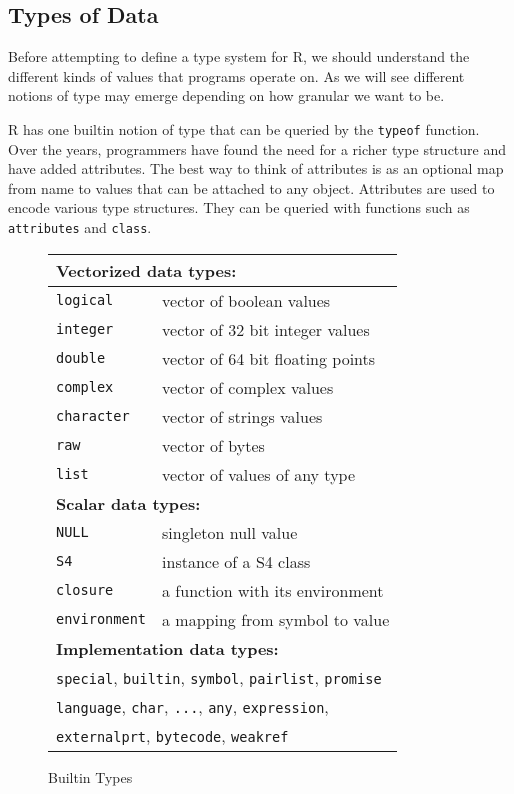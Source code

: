\documentclass[acmsmall,10pt,review,anonymous]{acmart}\settopmatter{printfolios=true,printccs=false,printacmref=false}
\begin{document}
\subsection{Types of Data}

Before attempting to define a type system for R, we should understand the
different kinds of values that programs operate on.  As we will see
different notions of type may emerge depending on how granular we want to
be.

\renewcommand{\k}[1]{{\tt #1}\xspace}

R has one builtin notion of type that can be queried by the \k{typeof}
function. Over the years, programmers have found the need for a richer type
structure and have added attributes. The best way to think of attributes is
as an optional map from name to values that can be attached to any object.
Attributes are used to encode various type structures. They can be queried
with functions such as \k{attributes} and \k{class}.

\begin{wrapfigure}{r}{6.1cm}
\footnotesize\begin{tabular}{l|l@{}}\hline
\multicolumn{2}{l}{\bf Vectorized data types:}  \\\hline
\k{logical}  & vector of boolean values\\
\k{integer}   & vector of 32 bit integer values\\
\k{double} & vector of 64 bit floating points\\
\k{complex} & vector of complex values\\
\k{character} & vector of strings values\\
\k{raw} & vector of bytes\\
\k{list} & vector of values of any type\\\hline
\multicolumn{2}{l}{\bf Scalar data types:}\\\hline
\k{NULL}  &  singleton null value\\
\k{S4}    &  instance of a S4 class \\
\k{closure} & a function with its environment\\
\k{environment} & a mapping from symbol to value \\\hline
\multicolumn{2}{l}{\bf Implementation data types:}\\\hline
\multicolumn{2}{l}{\k{special},
\k{builtin},
\k{symbol},
\k{pairlist},
\k{promise}}\\
\multicolumn{2}{l}{
\k{language},
\k{char},
\k{...}, 
\k{any},
\k{expression},
}\\
\multicolumn{2}{l}{
\k{externalprt},
\k{bytecode},
\k{weakref}}\\\hline
\end{tabular}\caption{Builtin Types}\label{types}\end{wrapfigure}
\end{document}
